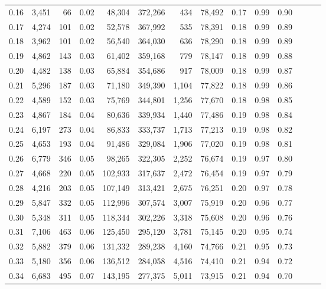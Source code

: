 \begin{tabular}{rrrrrrrrrrrrrr}
0.16 &  3,451 &     66 &  0.02 &   48,304 &  372,266 &     434 &  78,492 &  0.17 &  0.99 &      0.90 \\
0.17 &  4,274 &    101 &  0.02 &   52,578 &  367,992 &     535 &  78,391 &  0.18 &  0.99 &      0.89 \\
0.18 &  3,962 &    101 &  0.02 &   56,540 &  364,030 &     636 &  78,290 &  0.18 &  0.99 &      0.89 \\
0.19 &  4,862 &    143 &  0.03 &   61,402 &  359,168 &     779 &  78,147 &  0.18 &  0.99 &      0.88 \\
0.20 &  4,482 &    138 &  0.03 &   65,884 &  354,686 &     917 &  78,009 &  0.18 &  0.99 &      0.87 \\
0.21 &  5,296 &    187 &  0.03 &   71,180 &  349,390 &   1,104 &  77,822 &  0.18 &  0.99 &      0.86 \\
0.22 &  4,589 &    152 &  0.03 &   75,769 &  344,801 &   1,256 &  77,670 &  0.18 &  0.98 &      0.85 \\
0.23 &  4,867 &    184 &  0.04 &   80,636 &  339,934 &   1,440 &  77,486 &  0.19 &  0.98 &      0.84 \\
0.24 &  6,197 &    273 &  0.04 &   86,833 &  333,737 &   1,713 &  77,213 &  0.19 &  0.98 &      0.82 \\
0.25 &  4,653 &    193 &  0.04 &   91,486 &  329,084 &   1,906 &  77,020 &  0.19 &  0.98 &      0.81 \\
0.26 &  6,779 &    346 &  0.05 &   98,265 &  322,305 &   2,252 &  76,674 &  0.19 &  0.97 &      0.80 \\
0.27 &  4,668 &    220 &  0.05 &  102,933 &  317,637 &   2,472 &  76,454 &  0.19 &  0.97 &      0.79 \\
0.28 &  4,216 &    203 &  0.05 &  107,149 &  313,421 &   2,675 &  76,251 &  0.20 &  0.97 &      0.78 \\
0.29 &  5,847 &    332 &  0.05 &  112,996 &  307,574 &   3,007 &  75,919 &  0.20 &  0.96 &      0.77 \\
0.30 &  5,348 &    311 &  0.05 &  118,344 &  302,226 &   3,318 &  75,608 &  0.20 &  0.96 &      0.76 \\
0.31 &  7,106 &    463 &  0.06 &  125,450 &  295,120 &   3,781 &  75,145 &  0.20 &  0.95 &      0.74 \\
0.32 &  5,882 &    379 &  0.06 &  131,332 &  289,238 &   4,160 &  74,766 &  0.21 &  0.95 &      0.73 \\
0.33 &  5,180 &    356 &  0.06 &  136,512 &  284,058 &   4,516 &  74,410 &  0.21 &  0.94 &      0.72 \\
0.34 &  6,683 &    495 &  0.07 &  143,195 &  277,375 &   5,011 &  73,915 &  0.21 &  0.94 &      0.70 \\

\end{tabular}
